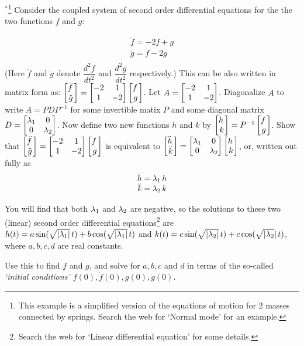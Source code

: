 \begin{prob}
\end{prob} \begin{prob} \label{prob23.4} $^{\ast}$\footnote{ This example is a simplified version of the equations of motion for 2 masses connected by springs. Search the web for `Normal mode' for an example. } Consider the coupled  system of second order differential equations for the the two functions $f$ and $g$:

$$\begin{matrix} 
\ddot f=-2 f +g  \\
\ddot g=f-2g\\
 \end{matrix} $$(Here $\ddot f$ and $\ddot g$ denote $\dfrac{d^2 f}{dt^2}$ and $\dfrac{d^2 g}{dt^2}$ respectively.)
This can be also written in matrix form as: $\bmatrix \ddot f \,\\ \ddot g
 \endbmatrix =\bmatrix -2 & 1 \\
 1 & -2 \endbmatrix \bmatrix  f \,\\   g
 \endbmatrix$. 
Let $A=\bmatrix -2 & 1 \\
 1 & -2 \endbmatrix $. Diagonalize $A$ to  write $A=PDP^{-1}$ for some invertible matix $P$ and some diagonal matrix $D=\bmatrix \lam_1 & 0 \\
 0 & \lam_2 \endbmatrix $. Now define two new functions $h$ and $k$ by  $\bmatrix h \,\\ k
 \endbmatrix = P^{-1} \bmatrix  f \,\\   g
 \endbmatrix$. Show that $\bmatrix \ddot f \,\\ \ddot g
 \endbmatrix =\bmatrix -2 & 1 \\
 1 & -2 \endbmatrix \bmatrix  f \,\\   g
 \endbmatrix$ is equivalent to $\bmatrix \ddot h\,\\ \ddot k
 \endbmatrix =\bmatrix \lam_1 & 0 \\
 0 & \lam_2 \endbmatrix\bmatrix  h \,\\   k
 \endbmatrix$, or, written out fully as
$$\begin{matrix} 
\ddot h=\lambda_1 \,h  \\
\ddot k=\lambda_2 \,k\\
 \end{matrix} $$ 

  You will find that both $\lambda_1$ and $\lambda_2$ are negative, so the solutions to these two (linear) second order differential equations\footnote{ Search the web  for `Linear differential equation' for some details.} are $h(t)=a \sin( \sqrt{|\lambda_1|}\,t) + b \cos( \sqrt{|\lambda_1|}\,t)$ and $k(t)=c \sin( \sqrt{|\lambda_2|}\,t) + c \cos( \sqrt{|\lambda_2}|\,t)$, where $a,b,c,d$ are real constants.

\medskip
  Use this to find $f$ and $g$, and solve for $a,b,c$ and $d$  in terms of  the so-called {\it `initial conditions' $f(0), \dot f(0), g(0), \dot g(0)$}.
\medskip
%


\end{prob}

